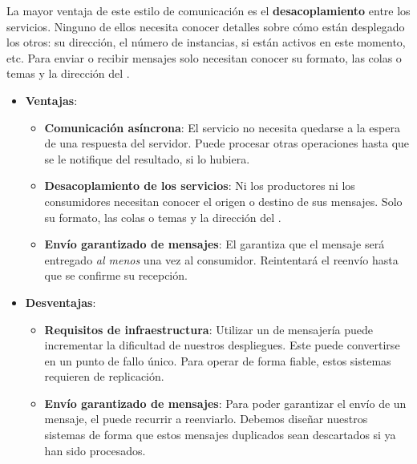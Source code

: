 
La mayor ventaja de este estilo de comunicación es el \textbf{desacoplamiento} entre los servicios. \cite{korabUnderstandingMessageBrokers2017}
Ninguno de ellos necesita conocer detalles sobre cómo están desplegado los otros: su dirección, el número de instancias, si están activos en este momento, etc. Para enviar o recibir mensajes solo necesitan conocer su formato, las colas o temas y la dirección del .

\begin{itemize}
  \item \textbf{Ventajas}:

  \begin{itemize}
    \item \textbf{Comunicación asíncrona}: El servicio no necesita quedarse a la espera de una respuesta del servidor. Puede procesar otras operaciones hasta que se le notifique del resultado, si lo hubiera.

    \item \textbf{Desacoplamiento de los servicios}: Ni los productores ni los consumidores necesitan conocer el origen o destino de sus mensajes. Solo su formato, las colas o temas y la dirección del .

    \item \textbf{Envío garantizado de mensajes}: El  garantiza que el mensaje será entregado \emph{al menos} una vez al consumidor. Reintentará el reenvío hasta que se confirme su recepción.

  \end{itemize}

  \item \textbf{Desventajas}:

  \begin{itemize}
    \item \textbf{Requisitos de infraestructura}: Utilizar un  de mensajería puede incrementar la dificultad de nuestros despliegues. Este puede convertirse en un punto de fallo único. Para operar de forma fiable, estos sistemas requieren de replicación. \cite{newmanBuildingMicroservicesDesigning2021}

    \item \textbf{Envío garantizado de mensajes}: Para poder garantizar el envío de un mensaje, el  puede recurrir a reenviarlo. Debemos diseñar nuestros sistemas de forma que estos mensajes duplicados sean descartados si ya han sido procesados.
  \end{itemize}
\end{itemize}

